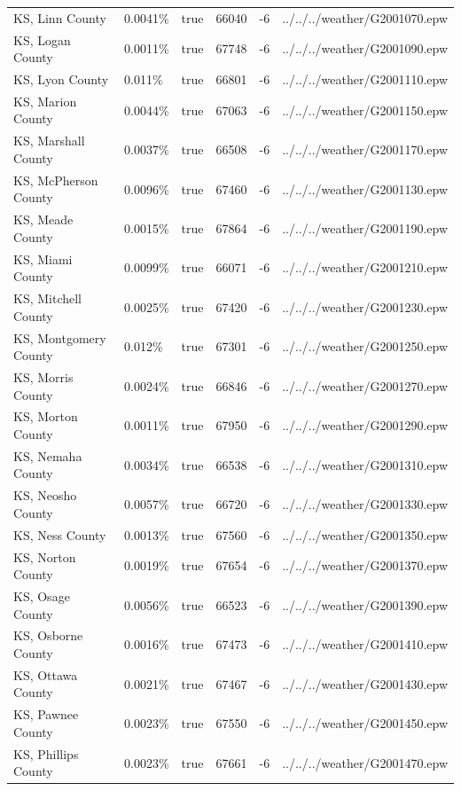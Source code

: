 \begin{longtable}[]{@{}llllll@{}}
KS, Linn County & 0.0041\% & true & 66040 & -6 &
../../../weather/G2001070.epw \\
KS, Logan County & 0.0011\% & true & 67748 & -6 &
../../../weather/G2001090.epw \\
KS, Lyon County & 0.011\% & true & 66801 & -6 &
../../../weather/G2001110.epw \\
KS, Marion County & 0.0044\% & true & 67063 & -6 &
../../../weather/G2001150.epw \\
KS, Marshall County & 0.0037\% & true & 66508 & -6 &
../../../weather/G2001170.epw \\
KS, McPherson County & 0.0096\% & true & 67460 & -6 &
../../../weather/G2001130.epw \\
KS, Meade County & 0.0015\% & true & 67864 & -6 &
../../../weather/G2001190.epw \\
KS, Miami County & 0.0099\% & true & 66071 & -6 &
../../../weather/G2001210.epw \\
KS, Mitchell County & 0.0025\% & true & 67420 & -6 &
../../../weather/G2001230.epw \\
KS, Montgomery County & 0.012\% & true & 67301 & -6 &
../../../weather/G2001250.epw \\
KS, Morris County & 0.0024\% & true & 66846 & -6 &
../../../weather/G2001270.epw \\
KS, Morton County & 0.0011\% & true & 67950 & -6 &
../../../weather/G2001290.epw \\
KS, Nemaha County & 0.0034\% & true & 66538 & -6 &
../../../weather/G2001310.epw \\
KS, Neosho County & 0.0057\% & true & 66720 & -6 &
../../../weather/G2001330.epw \\
KS, Ness County & 0.0013\% & true & 67560 & -6 &
../../../weather/G2001350.epw \\
KS, Norton County & 0.0019\% & true & 67654 & -6 &
../../../weather/G2001370.epw \\
KS, Osage County & 0.0056\% & true & 66523 & -6 &
../../../weather/G2001390.epw \\
KS, Osborne County & 0.0016\% & true & 67473 & -6 &
../../../weather/G2001410.epw \\
KS, Ottawa County & 0.0021\% & true & 67467 & -6 &
../../../weather/G2001430.epw \\
KS, Pawnee County & 0.0023\% & true & 67550 & -6 &
../../../weather/G2001450.epw \\
KS, Phillips County & 0.0023\% & true & 67661 & -6 &
../../../weather/G2001470.epw \\

\end{longtable}
